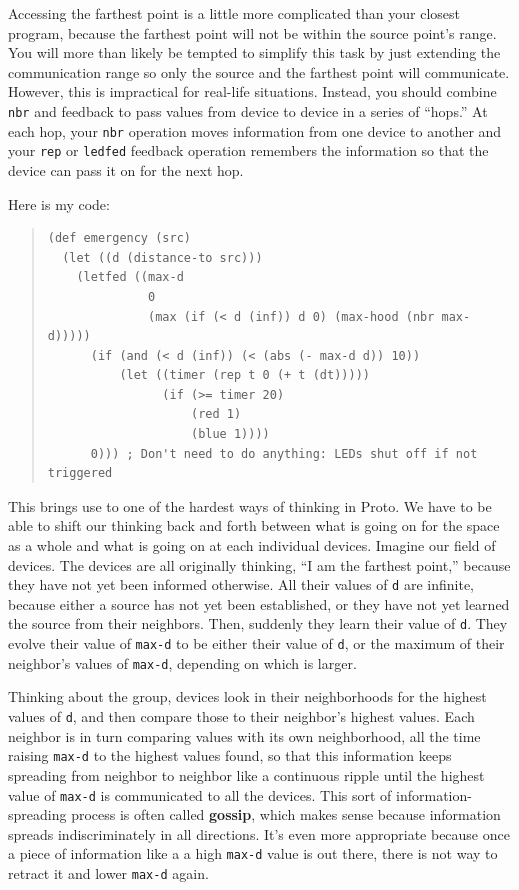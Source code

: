 \documentclass{article}
\newcommand\var[1]{{\tt #1}}
\begin{document}
{Accessing the farthest point is a little more complicated than your
closest program, because the farthest point will not be within the
source point's range.  You will more than likely be tempted to
simplify this task by just extending the communication range so only
the source and the farthest point will communicate.  However, this is
impractical for real-life situations.  Instead, you should combine
\var{nbr} and feedback to pass values from device to device in a
series of ``hops.''  At each hop, your \var{nbr} operation moves
information from one device to another and your \var{rep} or
\var{ledfed} feedback operation remembers the information so that the
device can pass it on for the next hop.

Here is my code:
\begin{quote}
\begin{verbatim}
(def emergency (src) 
  (let ((d (distance-to src))) 
    (letfed ((max-d 
              0 
              (max (if (< d (inf)) d 0) (max-hood (nbr max-d)))))
      (if (and (< d (inf)) (< (abs (- max-d d)) 10)) 
          (let ((timer (rep t 0 (+ t (dt)))))                        
                (if (>= timer 20) 
                    (red 1) 
                    (blue 1))))
      0))) ; Don't need to do anything: LEDs shut off if not triggered
\end{verbatim}
\end{quote}

This brings use to one of the hardest ways of thinking in Proto.  We
have to be able to shift our thinking back and forth between what is
going on for the space as a whole and what is going on at each
individual devices.  Imagine our field of devices. The devices are all
originally thinking, ``I am the farthest point,'' because they have
not yet been informed otherwise.  All their values of \var{d} are
infinite, because either a source has not yet been established, or
they have not yet learned the source from their neighbors.  Then,
suddenly they learn their value of \var{d}.  They evolve their value
of \var{max-d} to be either their value of \var{d}, or the maximum of
their neighbor's values of \var{max-d}, depending on which is larger.

Thinking about the group, devices look in their neighborhoods for the
highest values of \var{d}, and then compare those to their neighbor's
highest values.  Each neighbor is in turn comparing values with its
own neighborhood, all the time raising \var{max-d} to the highest
values found, so that this information keeps spreading from neighbor
to neighbor like a continuous ripple until the highest value of
\var{max-d} is communicated to all the devices.  This sort of
information-spreading process is often called {\bf gossip}, which
makes sense because information spreads indiscriminately in all
directions.  It's even more appropriate because once a piece of
information like a a high \var{max-d} value is out there, there is not
way to retract it and lower \var{max-d} again.

}
\end{document}
